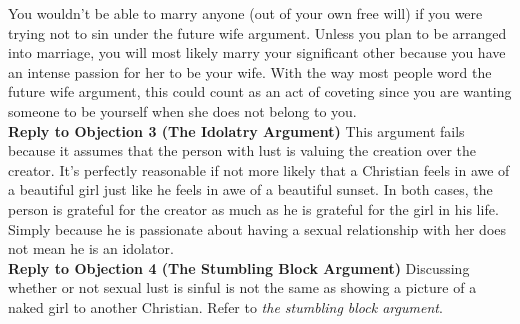 \documentclass[a4paper, parskip=full, 12pt]{article}
\begin{document}
You wouldn't be able to marry anyone (out of your own free will) if you were trying not to sin under the future wife argument. Unless you plan to be arranged into marriage, you will most likely marry your significant other because you have an intense passion for her to be your wife. With the way most people word the future wife argument, this could count as an act of coveting since you are wanting someone to be yourself when she does not belong to you. \\
\textbf{Reply to Objection 3 (The Idolatry Argument)} This argument fails because it assumes that the person with lust is valuing the creation over the creator. It's perfectly reasonable if not more likely that a Christian feels in awe of a beautiful girl just like he feels in awe of a beautiful sunset. In both cases, the person is grateful for the creator as much as he is grateful for the girl in his life. Simply because he is passionate about having a sexual relationship with her does not mean he is an idolator. \\
\textbf{Reply to Objection 4 (The Stumbling Block Argument)} Discussing whether or not sexual lust is sinful is not the same as showing a picture of a naked girl to another Christian. Refer to \textit{the stumbling block argument}. \\
\end{document}
